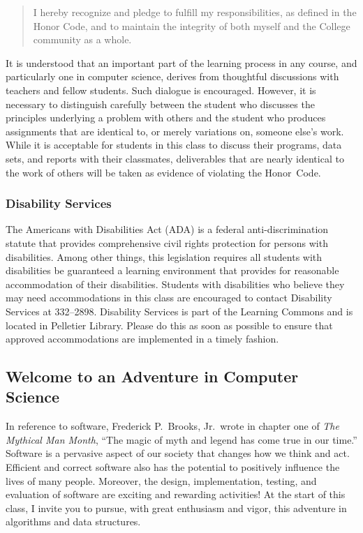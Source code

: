 \documentclass[11pt]{article}
\begin{document}
\vspace*{-.11in}
\begin{quote}
  I hereby recognize and pledge to fulfill my responsibilities, as defined in the Honor Code, and to maintain the
  integrity of both myself and the College community as a whole.
\end{quote}
\vspace*{-.11in}

\noindent It is understood that an important part of the learning process in any
course, and particularly one in computer science, derives from thoughtful
discussions with teachers and fellow students. Such dialogue is encouraged.
However, it is necessary to distinguish carefully between the student who
discusses the principles underlying a problem with others and the student who
produces assignments that are identical to, or merely variations on, someone
else's work. While it is acceptable for students in this class to discuss their
programs, data sets, and reports with their classmates, deliverables that are
nearly identical to the work of others will be taken as evidence of violating
the \mbox{Honor Code}.

\subsubsection*{Disability Services}

The Americans with Disabilities Act (ADA) is a federal anti-discrimination
statute that provides comprehensive civil rights protection for persons with
disabilities. Among other things, this legislation requires all students with
disabilities be guaranteed a learning environment that provides for reasonable
accommodation of their disabilities. Students with disabilities who believe they
may need accommodations in this class are encouraged to contact Disability
Services at 332--2898. Disability Services is part of the Learning Commons and
is located in Pelletier Library. Please do this as soon as possible to ensure
that approved accommodations are implemented in a timely fashion.

\subsection*{Welcome to an Adventure in Computer Science}

In reference to software, Frederick P.\ Brooks, Jr.\ wrote in chapter one of
{\em The Mythical Man Month}, ``The magic of myth and legend has come true in
our time.'' Software is a pervasive aspect of our society that changes how we
think and act. Efficient and correct software also has the potential to
positively influence the lives of many people. Moreover, the design,
implementation, testing, and evaluation of software are exciting and rewarding
activities! At the start of this class, I invite you to pursue, with great
enthusiasm and vigor, this adventure in algorithms and data structures.
\end{document}
